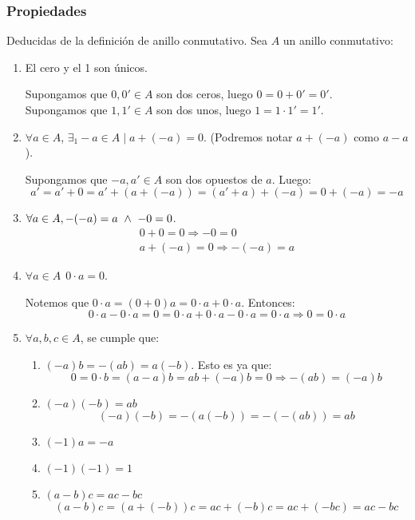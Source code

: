 \subsubsection{Propiedades}
Deducidas de la definición de anillo conmutativo. Sea $A$ un anillo conmutativo:
\begin{enumerate}
    \item El cero y el 1 son únicos.

    Supongamos que $0, 0' \in A$ son dos ceros, luego $0 = 0+0' = 0'$.\\    
    Supongamos que $1, 1' \in A$ son dos unos, luego $1 = 1\cdot 1' = 1'$.

    \item $\forall a \in A$, $\exists_1 -a \in A \mid a + (-a) = 0$. (Podremos notar $a+(-a)$ como $a-a$).

    Supongamos que $-a, a' \in A$ son dos opuestos de $a$. Luego:
    $$a' = a' + 0 = a' + (a +(-a)) = (a' + a) + (-a) = 0 + (-a) = -a$$

    \item $\forall a \in A, -(-a) = a \ \land \  -0 = 0$.
    \begin{gather*}
        0 + 0 = 0 \Longrightarrow -0 = 0\\
        a + (-a) = 0 \Longrightarrow -(-a) = a
    \end{gather*}

    \item $\forall a \in A~~0 \cdot a = 0$.

    Notemos que $0 \cdot a = (0+0)a = 0\cdot a + 0\cdot a$. Entonces:
    \begin{equation*}
        0\cdot a - 0\cdot a = 0 = 0\cdot a + 0\cdot a - 0\cdot a = 0\cdot a \Longrightarrow 0 = 0\cdot a
    \end{equation*}

    \item $\forall a,b,c \in A$, se cumple que:
    \begin{enumerate}
        \item $(-a)b = -(ab) = a(-b)$. Esto es ya que:
        \begin{equation*}
            0 = 0\cdot b = (a-a)b = ab + (-a)b = 0 \Longrightarrow -(ab) = (-a)b
        \end{equation*}
        
        \item $(-a)(-b) = ab$
        \begin{equation*}
            (-a)(-b) = -(a(-b)) = -(-(ab)) = ab
        \end{equation*}
        \item $(-1)a=-a$
        \item $(-1)(-1)=1$
        \item $(a-b)c = ac - bc$
        \begin{equation*}
            (a-b)c = (a+(-b))c = ac + (-b)c = ac + (-bc) = ac - bc
        \end{equation*}
    \end{enumerate}
\end{enumerate}

